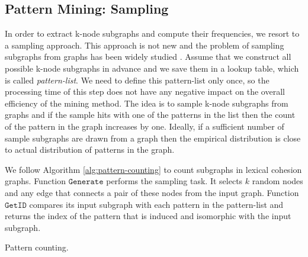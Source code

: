\subsection{Pattern Mining: Sampling}
In order to extract k-node subgraphs and compute their frequencies, we resort to a sampling approach. 
This approach is not new and the problem of sampling subgraphs from graphs has been widely studied \cite{weissman03,shervashidze09}. 
Assume that we construct all possible k-node subgraphs in advance and we save them in a lookup table, which is called \emph{pattern-list}.  
We need to define this pattern-list only once, so the processing time of this step does not have any negative impact on the overall efficiency of the mining method.  
The idea is to sample k-node subgraphs from graphs and if the sample hits with one of the patterns in the list then the count of the pattern in the graph increases by one. 
Ideally, if a sufficient number of sample subgraphs are drawn from a graph then the empirical distribution is close to actual distribution of patterns in the graph. 

We follow Algorithm \ref{alg:pattern-counting} to count subgraphs in lexical cohesion graphs.  
Function $\mathtt{Generate}$ performs the sampling task.  
It selects $k$ random nodes and any edge that connects a pair of these nodes from the input graph. 
Function $\mathtt{GetID}$ compares its input subgraph with each pattern in the pattern-list and returns the index of the pattern that is induced and isomorphic with the input subgraph.  

\begin{algorithm}
    \begin{algorithmic}[1]
                \EndWhile
            \EndWhile
        \EndFunction
    \end{algorithmic}
    \caption{Pattern counting.}
    \label{alg:pattern-counting}
\end{algorithm}


